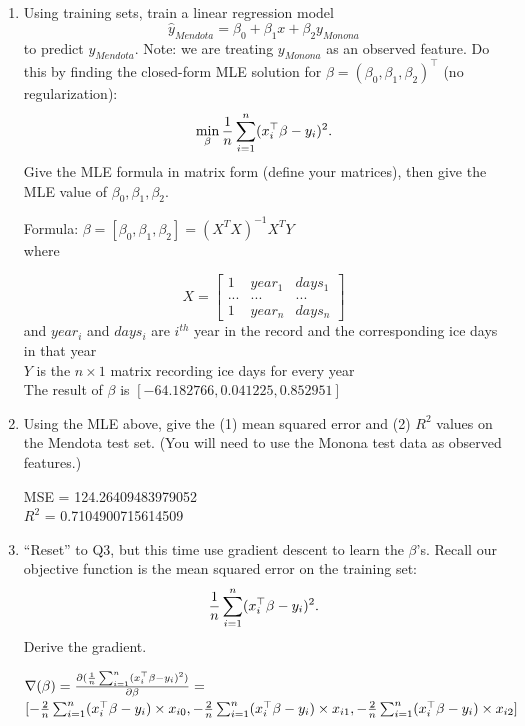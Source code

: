 \documentclass[a4paper]{article}
\theoremstyle{definition}
\newenvironment{soln}{
    \leavevmode\color{blue}\ignorespaces
}{}
\begin{document}
\begin{enumerate}
\item
Using training sets, train a linear regression model
$$\hat y_{Mendota} = \beta_0 + \beta_1 x + \beta_2 y_{Monona}$$
to predict $y_{Mendota}$.
Note: we are treating $y_{Monona}$ as an observed feature.
Do this by finding the closed-form MLE solution for $\beta=(\beta_0, \beta_1, \beta_2)^\top$ (no regularization):
$$\min_\beta {1\over n} \sum_{i=1}^n (x_i^\top \beta - y_i)^2.$$
Give the MLE formula in matrix form (define your matrices), then give the MLE value of $\beta_0, \beta_1, \beta_2$. 

\begin{soln}
Formula: $\beta = [\beta_0, \beta_1, \beta_2] = (X^TX)^{-1}X^TY$\\
where 

$$  
X =
\begin{bmatrix}
   1 & year_1 & days_1 \\
   ...& ... & ... \\
   1 & year_{n} & days_{n} 
 \end{bmatrix} $$ 
and $year_i$ and $days_i$ are $i^{th}$ year in the record and the corresponding ice days in that year\\
$Y$ is the $n\times 1$ matrix recording ice days for every year\\
The result of $\beta$ is $[-64.182766, 0.041225, 0.852951]$

\end{soln} 


\item
Using the MLE above, give the (1) mean squared error and (2) $R^2$ values on the Mendota test set.
(You will need to use the Monona test data as observed features.)


\begin{soln}
MSE = 124.26409483979052\\ 
$R^{2}$ = 0.7104900715614509
\end{soln}

\item
``Reset'' to Q3, but this time use gradient descent to learn the $\beta$'s.
Recall our objective function is the mean squared error on the training set:
$${1\over n} \sum_{i=1}^n (x_i^\top \beta - y_i)^2.$$
Derive the gradient.

\begin{soln}
$\nabla(\beta) = \frac{\partial ({1\over n} \sum_{i=1}^n (x_i^\top \beta - y_i)^2)}{\partial \beta} =$\\ $ [-{2\over n} \sum_{i=1}^n (x_i^\top \beta - y_i)\times x_{i0}, -{2\over n} \sum_{i=1}^n (x_i^\top \beta - y_i)\times x_{i1}, -{2\over n} \sum_{i=1}^n (x_i^\top \beta - y_i)\times x_{i2}]$\\


\end{soln}
\end{enumerate}
\end{document}
